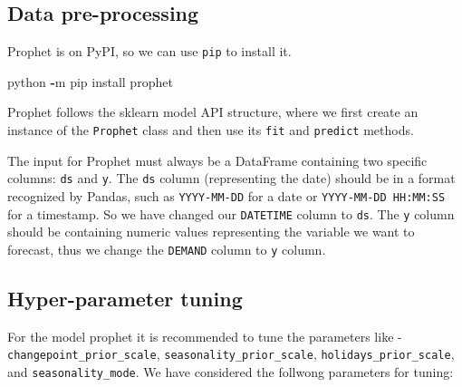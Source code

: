 \documentclass[mstat,12pt]{unswthesis}
\newenvironment{Shaded}{\begin{snugshade}}{\end{snugshade}}
\newcommand{\NormalTok}[1]{#1}
\newcommand{\OperatorTok}[1]{\textcolor[rgb]{0.81,0.36,0.00}{\textbf{#1}}}
\begin{document}
\subsection{Data pre-processing}\label{data-pre-processing}

Prophet is on PyPI, so we can use \texttt{pip} to install it.

\begin{Shaded}
\begin{Highlighting}[]
\NormalTok{python }\OperatorTok{{-}}\NormalTok{m pip install prophet}
\end{Highlighting}
\end{Shaded}

Prophet follows the sklearn model API structure, where we first create
an instance of the \texttt{Prophet} class and then use its \texttt{fit}
and \texttt{predict} methods.

The input for Prophet must always be a DataFrame containing two specific
columns: \texttt{ds} and \texttt{y}. The \texttt{ds} column
(representing the date) should be in a format recognized by Pandas, such
as \texttt{YYYY-MM-DD} for a date or \texttt{YYYY-MM-DD\ HH:MM:SS} for a
timestamp. So we have changed our \texttt{DATETIME} column to
\texttt{ds}. The \texttt{y} column should be containing numeric values
representing the variable we want to forecast, thus we change the
\texttt{DEMAND} column to \texttt{y} column.

\subsection{Hyper-parameter tuning}\label{hyper-parameter-tuning}

For the model prophet it is recommended to tune the parameters like -
\linebreak \texttt{changepoint\_prior\_scale},
\texttt{seasonality\_prior\_scale}, \texttt{holidays\_prior\_scale}, and
\texttt{seasonality\_mode}. We have considered the follwong parameters
for tuning:
\end{document}
